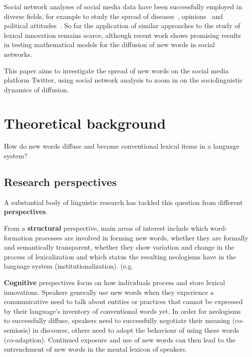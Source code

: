 \documentclass[a4paper]{scrartcl}
\renewcommand{\hw}[1]{\textbf{#1}}
\begin{document}
  Social network analyses of social media data have been successfully employed in diverse fields, for example to study the spread of diseases~\parencite{Lu2018}, opinions~\parencite{West2014} and political attitudes~\parencite{Pew-Research-Center2019}. So far the application of similar approaches to the study of lexical innovation remains scarce, although recent work shows promising results in testing mathematical models for the diffusion of new words in social networks.~\parencite{Goel2016}


  This paper aims to investigate the spread of new words on the social media platform Twitter, using social network analysis to zoom in on the sociolinguistic dynamics of diffusion.

\section{Theoretical background}

  How do new words diffuse and become conventional lexical items in a language system?

  \subsection{Research perspectives}

    A substantial body of linguistic research has tackled this question from different \hw{perspectives}. \parencite[16]{Schmid2016}

    From a \hw{structural} perspective, main areas of interest include which word-formation processes are involved in forming new words, whether they are formally and semantically transparent, whether they show variation and change in the process of lexicalization and which status the resulting neologisms have in the language system (institutionalization). (e.g. \cite{Bauer1983,Lipka2005}

    \hw{Cognitive} perspectives focus on how individuals process and store lexical innovations. Speakers generally use new words when they experience a communicative need to talk about entities or practices that cannot be expressed by their language's inventory of conventional words yet. In order for neologisms to successfully diffuse, speakers need to successfully negotiate their meaning (co-semiosis) in discourse, others need to adopt the behaviour of using these words (co-adaption). Continued exposure and use of new words can then lead to the entrenchment of new words in the mental lexicon of speakers.~\parencite{Schmid2008}
\end{document}
